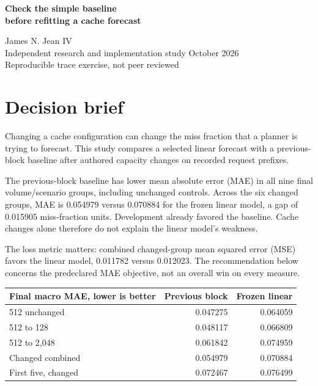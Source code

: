 \documentclass[11pt]{article}
\newcommand{\MControlBase}{0.047275}
\newcommand{\MControlLinear}{0.064059}
\newcommand{\MShrinkBase}{0.048117}
\newcommand{\MShrinkLinear}{0.066809}
\newcommand{\MExpandBase}{0.061842}
\newcommand{\MExpandLinear}{0.074959}
\newcommand{\MChangedPrimaryBase}{0.054979}
\newcommand{\MChangedPrimaryLinear}{0.070884}
\newcommand{\MChangedFirstFiveBase}{0.072467}
\newcommand{\MChangedFirstFiveLinear}{0.076499}
\newcommand{\MChangedBaseMSE}{0.012023}
\newcommand{\MChangedLinearMSE}{0.011782}
\newcommand{\MDelta}{0.015905}
\begin{document}
\begin{center}
{\LARGE\bfseries Check the simple baseline\\before refitting a cache forecast}\par
\vspace{8pt}James N. Jean IV\\
Independent research and implementation study October 2026\\
{\small Reproducible trace exercise, not peer reviewed}
\end{center}
\section*{Decision brief}
Changing a cache configuration can change the miss fraction that a planner is trying to forecast. This study compares a selected linear forecast with a previous-block baseline after authored capacity changes on recorded request prefixes.

The previous-block baseline has lower mean absolute error (MAE) in all nine final volume/scenario groups, including unchanged controls. Across the six changed groups, MAE is \MChangedPrimaryBase{} versus \MChangedPrimaryLinear{} for the frozen linear model, a gap of \MDelta{} miss-fraction units. Development already favored the baseline. Cache changes alone therefore do not explain the linear model's weakness.

The loss metric matters: combined changed-group mean squared error (MSE) favors the linear model, \MChangedLinearMSE{} versus \MChangedBaseMSE{}. The recommendation below concerns the predeclared MAE objective, not an overall win on every measure.

\begin{center}\begin{tabular}{lrr}\toprule
Final macro MAE, lower is better & Previous block & Frozen linear\\\midrule
512 unchanged & \MControlBase & \MControlLinear \\
512 to 128 & \MShrinkBase & \MShrinkLinear \\
512 to 2,048 & \MExpandBase & \MExpandLinear \\
Changed combined & \MChangedPrimaryBase & \MChangedPrimaryLinear \\
First five, changed & \MChangedFirstFiveBase & \MChangedFirstFiveLinear \\
\bottomrule\end{tabular}\end{center}
\end{document}
